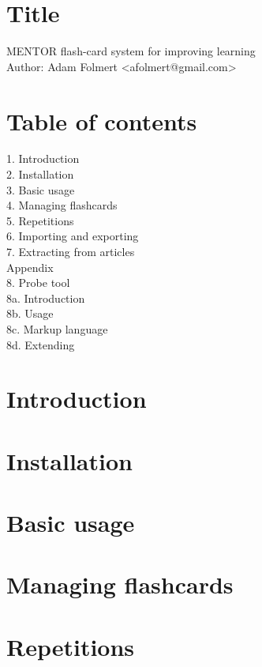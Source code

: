 \documentclass[a4paper,11pt]{article}
\begin{document}

\section{Title}

MENTOR
flash-card system for improving learning\\
Author: Adam Folmert <afolmert@gmail.com>\\

\section{Table of contents}
1. Introduction\\
2. Installation\\
3. Basic usage\\
4. Managing flashcards\\
5. Repetitions\\
6. Importing and exporting\\
7. Extracting from articles\\

Appendix\\

8. Probe tool\\
8a. Introduction\\
8b. Usage\\
8c. Markup language\\
8d. Extending\\


\section{Introduction}

\section{Installation}

\section{Basic usage}


\section{Managing flashcards}


\section{Repetitions}
\end{document}
